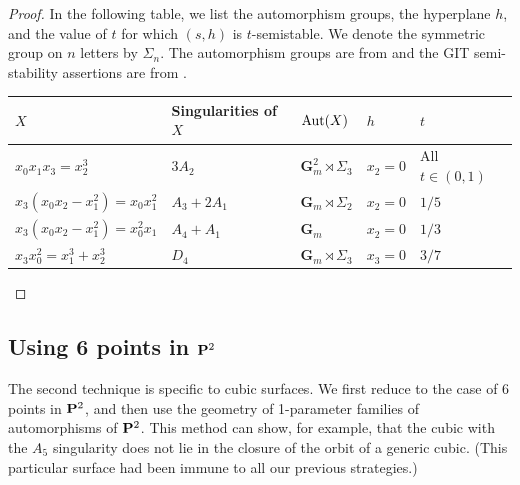 \documentclass[11pt,reqno, letterpaper]{amsart}
\numberwithin{equation}{section}
\newcommand{\G}{\mathbf G}
\begin{document}
\begin{proof}
  In the following table, we list the automorphism groups, the hyperplane $h$, and the value of $t$ for which $(s,h)$ is $t$-semistable.
  We denote the symmetric group on $n$ letters by $\Sigma_n$.
  The automorphism groups are from \cite{sak:10} and the GIT semi-stability assertions are from \cite{gal.mar:19}.
  \begin{center}
  \begin{tabular}{l l l l l}
    \toprule
    $X$ & Singularities of $X$& $\Aut(X)$ & $h$ & $t$\\
    \midrule
    $x_0x_1x_3 = x_2^3$& $3A_2$&$\G_m^2 \rtimes \Sigma_3$ & $x_2 = 0$ & All $t \in (0,1)$\\
    $x_3(x_0x_2-x_1^2) = x_0x_1^2$& $A_3+2A_1$&$\G_m \rtimes \Sigma_2$ & $x_2 = 0$ & $1/5$ \\
    $x_3(x_0x_2-x_1^2) = x_0^2x_1$&$A_4+A_1$& $\G_m$ & $x_2 = 0$ & $1/3$\\
    $x_3x_0^2 = x_1^3 + x_2^3$&$D_4$& $\G_m \rtimes \Sigma_3$ & $x_3 = 0$ & $3/7$\\
    \bottomrule
  \end{tabular}
\end{center}
\end{proof}

\subsection{Using 6 points in $\P^2$}
The second technique is specific to cubic surfaces.
We first reduce to the case of 6 points in $\P^2$, and then use the geometry of 1-parameter families of automorphisms of $\P^2$.
This method can show, for example, that the cubic with the $A_5$ singularity does not lie in the closure of the orbit of a generic cubic.
(This particular surface had been immune to all our previous strategies.)
\end{document}
